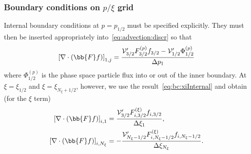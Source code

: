 \documentclass{notes}
\newcommand{\Vp}{\mathcal{V}'}
\begin{document}
    \subsubsection{Boundary conditions on $p/\xi$ grid}\label{sec:discr:adv:bc}
    Internal boundary conditions at $p=p_{1/2}$ must be specified explicitly.
    They must then be inserted appropriately into~\eqref{eq:advection:discr} so
    that
    \begin{equation}
        \left[ \nabla\cdot\left( \bb{F}f \right) \right]_{1,j} = \frac{
            \Vp_{3/2} F_{3/2}^{(p)} f_{3/2} - \Vp_{1/2}\Phi^{(p)}_{1/2}
        }{\Delta p_{1}}
    \end{equation}
    where $\Phi_{1/2}^{(p)}$ is the phase space particle flux into or out of
    the inner boundary. At $\xi=\xi_{1/2}$ and $\xi=\xi_{N_\xi+1/2}$, however,
    we use the result~\eqref{eq:bc:xiInternal} and obtain (for the $\xi$ term)
    \begin{equation}
        \begin{aligned}
            \left[ \nabla\cdot\left( \bb{F} f \right) \right]_{i,1} &=
                \frac{\Vp_{3/2} F^{(\xi)}_{i,3/2} f_{i,3/2}}{\Delta\xi_{1}},\\
            \left[ \nabla\cdot\left( \bb{F} f \right) \right]_{i,N_\xi} &=
                -\frac{\Vp_{N_\xi-1/2} F^{(\xi)}_{i,N_\xi-1/2} f_{i,N_\xi-1/2}}{\Delta\xi_{N_\xi}}.
        \end{aligned}
    \end{equation}
\end{document}
